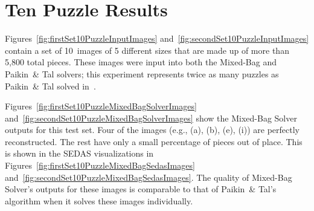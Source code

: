 \chapter{Ten Puzzle Results}\label{chap:tenPuzzleSolving}

Figures~\ref{fig:firstSet10PuzzleInputImages} and~\ref{fig:secondSet10PuzzleInputImages} contain a set of 10~images of 5 different sizes that are made up of more than 5,800 total pieces.  These images were input into both the Mixed-Bag and Paikin~\& Tal solvers; this experiment represents twice as many puzzles as Paikin~\& Tal solved in~\cite{paikin2015}.

Figures~\ref{fig:firstSet10PuzzleMixedBagSolverImages} and~\ref{fig:secondSet10PuzzleMixedBagSolverImages} show the Mixed-Bag Solver outputs for this test set.  Four of the images (e.g., (a), (b), (e), (i)) are perfectly reconstructed.  The rest have only a small percentage of pieces out of place.  This is shown in the SEDAS visualizations in Figures~\ref{fig:firstSet10PuzzleMixedBagSedasImages} and~\ref{fig:secondSet10PuzzleMixedBagSedasImages}.  The quality of Mixed-Bag Solver's outputs for these images is comparable to that of Paikin~\& Tal's algorithm when it solves these images individually.


